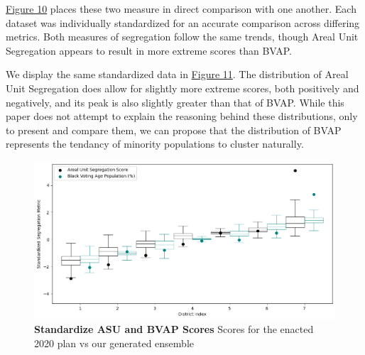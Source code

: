 \documentclass{article}
\begin{document}
\pagebreak

\par
\hyperref[fig 10]{Figure 10} places these two measure in direct comparison with one another. Each dataset was individually standardized for an accurate comparison across differing metrics. Both measures of segregation follow the same trends, though Areal Unit Segregation appears to result in more extreme scores than BVAP.
\par
We display the same standardized data in \hyperref[fig 11]{Figure 11}. The distribution of Areal Unit Segregation does allow for slightly more extreme scores, both positively and negatively, and its peak is also slightly greater than that of BVAP. While this paper does not attempt to explain the reasoning behind these distributions, only to present and compare them, we can propose that the distribution of BVAP represents the tendancy of minority populations to cluster naturally. 

\begin{figure}[h]\label{fig 10}
    \centering
    \includegraphics[scale=.45]{images/standardized_compare.png}
    \caption{\textbf{Standardize ASU and BVAP Scores} Scores for the enacted 2020 plan vs our generated ensemble}
\end{figure}
\end{document}

